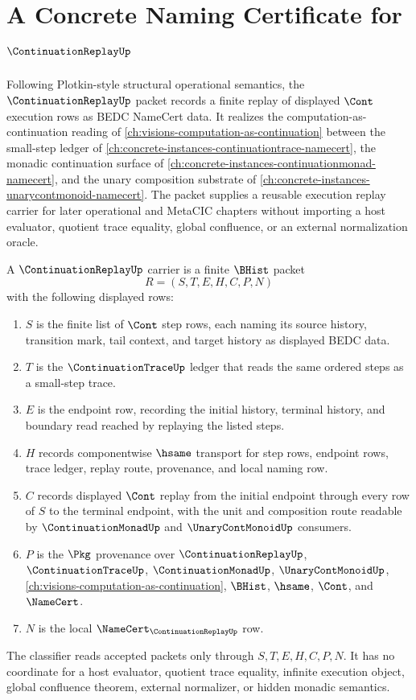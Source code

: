 \chapter{A Concrete Naming Certificate for $\ContinuationReplayUp$}
\label{ch:concrete-instances-continuation-replay-namecert}

Following Plotkin-style structural operational semantics, the $\ContinuationReplayUp$ packet records a finite replay of displayed $\Cont$ execution rows as BEDC NameCert data. It realizes the computation-as-continuation reading of \autoref{ch:visions-computation-as-continuation} between the small-step ledger of \autoref{ch:concrete-instances-continuationtrace-namecert}, the monadic continuation surface of \autoref{ch:concrete-instances-continuationmonad-namecert}, and the unary composition substrate of \autoref{ch:concrete-instances-unarycontmonoid-namecert}. The packet supplies a reusable execution replay carrier for later operational and MetaCIC chapters without importing a host evaluator, quotient trace equality, global confluence, or an external normalization oracle.

\begin{definition}\label{def:continuation-replay-carrier}
A $\ContinuationReplayUp$ carrier is a finite $\BHist$ packet
$$
R=(S,T,E,H,C,P,N)
$$
with the following displayed rows:
\begin{enumerate}
\item $S$ is the finite list of $\Cont$ step rows, each naming its source history, transition mark, tail context, and target history as displayed BEDC data.
\item $T$ is the $\ContinuationTraceUp$ ledger that reads the same ordered steps as a small-step trace.
\item $E$ is the endpoint row, recording the initial history, terminal history, and boundary read reached by replaying the listed steps.
\item $H$ records componentwise $\hsame$ transport for step rows, endpoint rows, trace ledger, replay route, provenance, and local naming row.
\item $C$ records displayed $\Cont$ replay from the initial endpoint through every row of $S$ to the terminal endpoint, with the unit and composition route readable by $\ContinuationMonadUp$ and $\UnaryContMonoidUp$ consumers.
\item $P$ is the $\Pkg$ provenance over $\ContinuationReplayUp$, $\ContinuationTraceUp$, $\ContinuationMonadUp$, $\UnaryContMonoidUp$, \autoref{ch:visions-computation-as-continuation}, $\BHist$, $\hsame$, $\Cont$, and $\NameCert$.
\item $N$ is the local $\NameCert_{\ContinuationReplayUp}$ row.
\end{enumerate}
The classifier reads accepted packets only through $S,T,E,H,C,P,N$. It has no coordinate for a host evaluator, quotient trace equality, infinite execution object, global confluence theorem, external normalizer, or hidden monadic semantics.
\end{definition}

